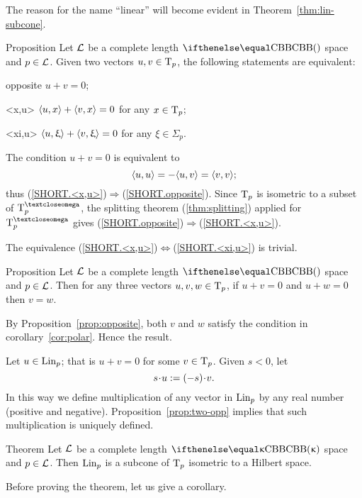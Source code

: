 The reason for the name ``linear'' will become evident in Theorem~\ref{thm:lin-subcone}.

\begin{thm}{Proposition}\label{prop:opposite}
Let $\mathcal{L}$ be a complete length $\Alex{}$ space and $p\in \spc{L}$.
Given two vectors $u,v\in\T_p$, the following statements are equivalent:
\begin{subthm}{opposite} $u+v=0$;
\end{subthm}
\begin{subthm}{<x,u>} $\langle u,x\rangle+\langle v,x\rangle=0$ for any $x\in\T_p$;
\end{subthm}
\begin{subthm}{<xi,u>} $\langle u,\upxi\rangle+\langle v,\upxi\rangle=0$ for any $\xi\in\Sigma_p$.
\end{subthm}
\end{thm}

The condition $u+v=0$ is equivalent to 
\[\langle u,u\rangle=-\langle u,v\rangle=\langle v,v\rangle;\]
thus 
(\ref{SHORT.<x,u>})$\Rightarrow$(\ref{SHORT.opposite}).
Since $\text{\rm T}_p$ is isometric to a subset of $\T^\o_p$,
the splitting theorem (\ref{thm:splitting}) applied for $\T_p^\o$
gives (\ref{SHORT.opposite})$\Rightarrow$(\ref{SHORT.<x,u>}).

The equivalence  (\ref{SHORT.<x,u>})$\Leftrightarrow$(\ref{SHORT.<xi,u>}) is trivial.
\qeds

\begin{thm}{Proposition}\label{prop:two-opp}
Let $\mathcal{L}$  be a complete length $\Alex{}$ space and $p\in \spc{L}$.
Then for any three vectors $u,v,w\in\T_p$, if $u+v=0$ and $u+ w=0$ then $v=w$.
\end{thm}

 By Proposition~\ref{prop:opposite}, both $v$ and $w$ satisfy the condition in corollary~\ref{cor:polar}. 
Hence the result.\qeds

Let $u\in \Lin_p$; that is $u+v=0$ for some $v\in\T_p$.
Given $s<0$, let 
\[s\cdot u\df (-s)\cdot v.\]
In this way we define multiplication of any vector in $\mathop{\rm Lin}\nolimits_p$ by any real number (positive and negative).
Proposition~\ref{prop:two-opp} implies that such multiplication is uniquely defined.


\begin{thm}{Theorem}\label{thm:lin-subcone}
Let $\mathcal{L}$  be a complete length $\Alex{\kappa}$ space and $p\in \spc{L}$. 
Then $\mathop{\rm Lin}\nolimits_p$ is a subcone of $\text{\rm T}_p$ isometric to a Hilbert space.
\end{thm}

Before proving the theorem, 
let us give a corollary.

